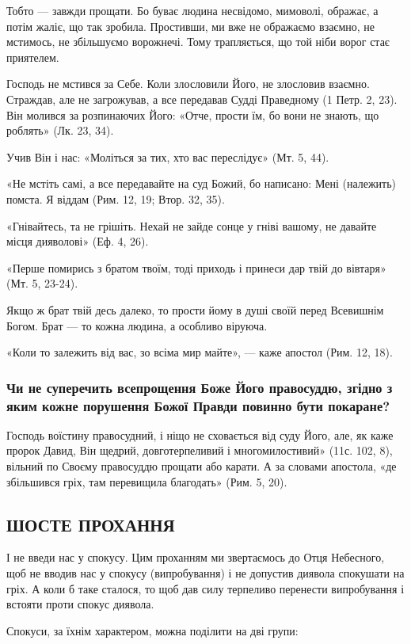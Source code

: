 \documentclass[main.tex]{subfiles}
\begin{document}
Тобто — завжди прощати. Бо буває людина несвідомо, мимоволі, ображає, а потім жаліє, що так зробила. Простивши, ми вже не ображаємо взаємно, не мстимось, не збільшуємо ворожнечі. Тому трапляється, що той ніби ворог стає приятелем.

Господь не мстився за Себе. Коли злословили Його, не злословив взаємно. Страждав, але не загрожував, а все передавав Судді Праведному (1 Петр. 2, 23). Він молився за розпинаючих Його: «Отче, прости їм, бо вони не знають, що роблять» (Лк. 23, 34).

Учив Він і нас: «Моліться за тих, хто вас переслідує» (Мт. 5, 44).

«Не мстіть самі, а все передавайте на суд Божий, бо написано: Мені (належить) помста. Я віддам (Рим. 12, 19; Втор. 32, 35).

«Гнівайтесь, та не грішіть. Нехай не зайде сонце у гніві вашому, не давайте місця дияволові» (Еф. 4, 26).

«Перше помирись з братом твоїм, тоді приходь і принеси дар твій до вівтаря» (Мт. 5, 23-24).

Якщо ж брат твій десь далеко, то прости йому в душі своїй перед Всевишнім Богом. Брат — то кожна людина, а особливо віруюча.

«Коли то залежить від вас, зо всіма мир майте», — каже апостол (Рим. 12, 18).

\subsubsection{Чи не суперечить всепрощення Боже Його правосуддю, згідно з яким кожне порушення Божої Правди повинно бути покаране?}

Господь воїстину правосудний, і ніщо не сховається від суду Його, але, як каже пророк Давид, Він щедрий, довготерпеливий і многомилостивий» (11с. 102, 8), вільний по Своєму правосуддю прощати або карати. А за словами апостола, «де збільшився гріх, там перевищила благодать» (Рим. 5, 20).

\subsection{ШОСТЕ ПРОХАННЯ}
І не введи нас у спокусу.
Цим проханням ми звертаємось до Отця Небесного, щоб не вводив нас у спокусу (випробування) і не допустив диявола спокушати на гріх. А коли б таке сталося, то щоб дав силу терпеливо перенести випробування і встояти проти спокус диявола.

Спокуси, за їхнім характером, можна поділити на дві групи:
\end{document}
